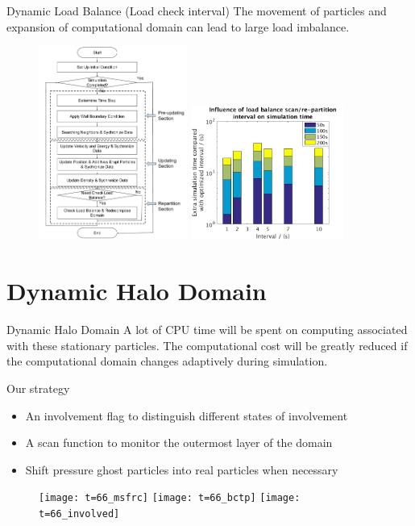 \documentclass{beamer}
\begin{document}
\begin{frame}{Dynamic Load Balance (Load check interval)}
The movement of particles and expansion of computational domain can lead to large load imbalance. 
\begin{figure}
\flushleft
\includegraphics[width=0.435\textwidth]{../Work_flow}
\hfill
\includegraphics[width=0.445\textwidth]{../int_bar}
\end{figure}
\end{frame}

\section{Dynamic Halo Domain}
\begin{frame}{Dynamic Halo Domain}
A lot of CPU time will be spent
on computing associated with these stationary particles. The computational cost will be greatly reduced if the computational domain changes adaptively during simulation. 
\begin{block}{Our strategy}
  \begin{itemize}
  \item {
    An involvement flag to distinguish different states of involvement
  }
  \item {
    A scan function to monitor the outermost layer of the domain
  }
  \item {
    Shift pressure ghost particles into real particles when necessary
  }
  \end{itemize}
\end{block}
%
\begin{figure}
\flushleft
\texttt{[image: t=66\_msfrc]}
\hfill
\texttt{[image: t=66\_bctp]}
\hfill
\texttt{[image: t=66\_involved]}
\end{figure}
\end{frame}
\end{document}
